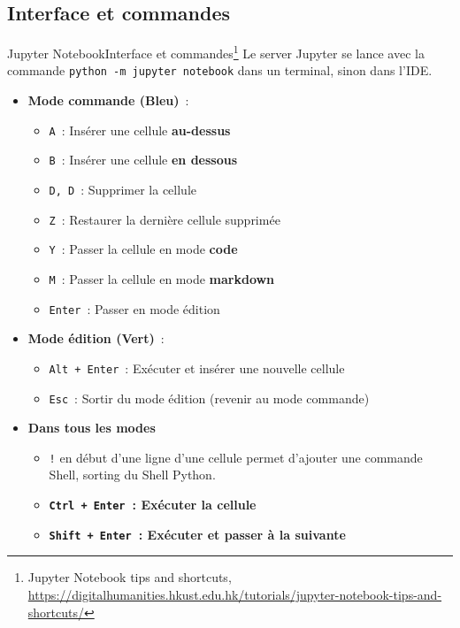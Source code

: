 \documentclass{beamer}
\begin{document}
    \subsection{Interface et commandes}
    \begin{frame}{Jupyter Notebook}{Interface et commandes\footnote{Jupyter Notebook tips and shortcuts, \url{https://digitalhumanities.hkust.edu.hk/tutorials/jupyter-notebook-tips-and-shortcuts/}}}
        \footnotesize
        Le server Jupyter se lance avec la commande \lstinline{python -m jupyter notebook} dans un terminal, sinon dans l'IDE.
        \begin{itemize}
            \footnotesize
            \item \textbf{Mode commande (Bleu)}~:
            \begin{itemize}
                \footnotesize
                \item \texttt{A}~: Insérer une cellule \textbf{au-dessus}
                \item \texttt{B}~: Insérer une cellule \textbf{en dessous}
                \item \texttt{D, D}~: Supprimer la cellule
                \item \texttt{Z}~: Restaurer la dernière cellule supprimée
                \item \texttt{Y}~: Passer la cellule en mode \textbf{code}
                \item \texttt{M}~: Passer la cellule en mode \textbf{markdown}
                \item \texttt{Enter}~: Passer en mode édition
            \end{itemize}

            \item \textbf{Mode édition (Vert)}~:
            \begin{itemize}
                \footnotesize
                \item \texttt{Alt + Enter}~: Exécuter et insérer une nouvelle cellule
                \item \texttt{Esc}~: Sortir du mode édition (revenir au mode commande)
            \end{itemize}
            \item \textbf{Dans tous les modes}
            \begin{itemize}
                \footnotesize
                \item \lstinline{!} en début d'une ligne d'une cellule permet d'ajouter une commande Shell, sorting du Shell Python.
                \item \textbf{\texttt{Ctrl + Enter}~: Exécuter la cellule}
                \item \textbf{\texttt{Shift + Enter}~: Exécuter et passer à la suivante}
            \end{itemize}
        \end{itemize}
    \end{frame}
\end{document}
